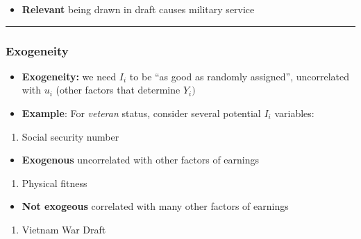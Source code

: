 \documentclass[
]{article}
\providecommand{\tightlist}{%
  \setlength{\itemsep}{0pt}\setlength{\parskip}{0pt}}
\begin{document}
\begin{itemize}
\tightlist
\item
  \textbf{Relevant} being drawn in draft causes military service
\end{itemize}

\begin{center}\rule{0.5\linewidth}{0.5pt}\end{center}

\hypertarget{exogeneity}{%
\subsubsection{Exogeneity}\label{exogeneity}}

\begin{itemize}
\item
  \textbf{Exogeneity:} we need \(I_i\) to be ``as good as randomly
  assigned'', uncorrelated with \(u_i\) (other factors that determine
  \(Y_i)\)
\item
  \textbf{Example}: For \emph{veteran} status, consider several
  potential \(I_i\) variables:
\end{itemize}

\begin{enumerate}
\def\labelenumi{\arabic{enumi}.}
\tightlist
\item
  Social security number
\end{enumerate}

\begin{itemize}
\tightlist
\item
  \textbf{Exogenous} uncorrelated with other factors of earnings
\end{itemize}

\begin{enumerate}
\def\labelenumi{\arabic{enumi}.}
\setcounter{enumi}{1}
\tightlist
\item
  Physical fitness
\end{enumerate}

\begin{itemize}
\tightlist
\item
  \textbf{Not exogeous} correlated with many other factors of earnings
\end{itemize}

\begin{enumerate}
\def\labelenumi{\arabic{enumi}.}
\setcounter{enumi}{2}
\tightlist
\item
  Vietnam War Draft
\end{enumerate}
\end{document}

